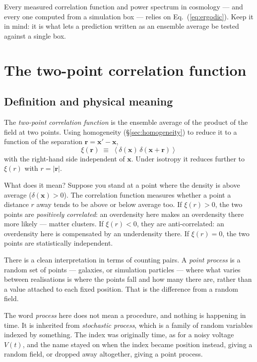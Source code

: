 \documentclass[12pt]{article}
\newcommand{\bx}{\mathbf{x}}
\newcommand{\br}{\mathbf{r}}
\newcommand{\avg}[1]{\left\langle #1 \right\rangle}
\begin{document}
Every measured correlation function and power spectrum in cosmology ---
and every one computed from a simulation box --- relies on
Eq.~(\ref{eq:ergodic}).  Keep it in mind: it is what lets a prediction
written as an ensemble average be tested against a single box.

\section{The two-point correlation function}
\label{sec:xi}

\subsection{Definition and physical meaning}
\label{sec:xi-def}

The \emph{two-point correlation function} is the ensemble average of the
product of the field at two points.  Using homogeneity
(\S\ref{sec:homogeneity}) to reduce it to a function of the separation
$\br = \bx' - \bx$,
\begin{equation}
  \boxed{\;\xi(\br) \;\equiv\; \avg{\delta(\bx)\,\delta(\bx+\br)}\;}
  \label{eq:xi-def-box}
\end{equation}
with the right-hand side independent of $\bx$.  Under isotropy it
reduces further to $\xi(r)$ with $r = |\br|$.

What does it mean?  Suppose you stand at a point where the density is
above average ($\delta(\bx) > 0$).  The correlation function measures
whether a point a distance $r$ away tends to be above or below average
too.  If $\xi(r) > 0$, the two points are \emph{positively correlated}:
an overdensity here makes an overdensity there more likely --- matter
clusters.  If $\xi(r) < 0$, they are anti-correlated: an overdensity
here is compensated by an underdensity there.  If $\xi(r) = 0$, the two
points are statistically independent.

There is a clean interpretation in terms of counting pairs.  A
\emph{point process} is a random set of points --- galaxies, or simulation
particles --- where what varies between realisations is where the points
fall and how many there are, rather than a value attached to each fixed
position.  That is the difference from a random field.

The word \emph{process} here does not mean a procedure, and nothing is
happening in time.  It is inherited from \emph{stochastic process}, which
is a family of random variables indexed by something.  The index was
originally time, as for a noisy voltage $V(t)$, and the name stayed on when
the index became position instead, giving a random field, or dropped away
altogether, giving a point process.
\end{document}
